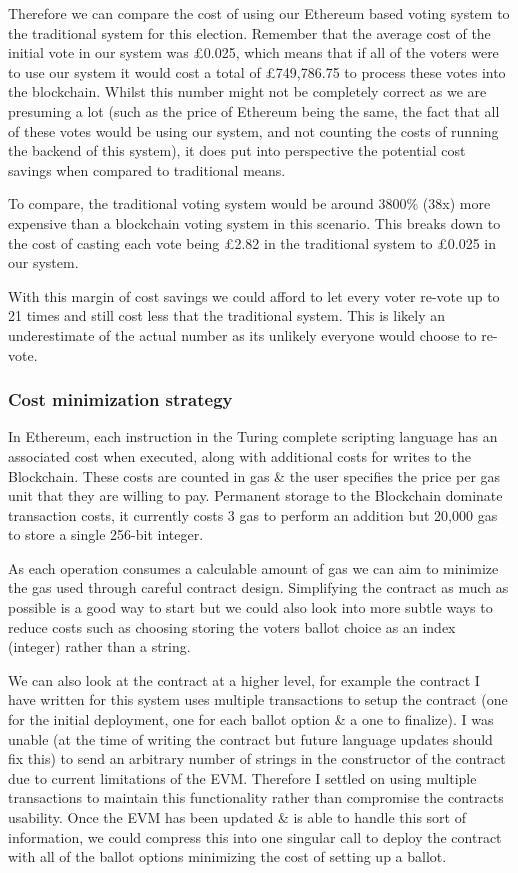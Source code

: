 \documentclass{article}
\begin{document}
	Therefore we can compare the cost of using our Ethereum based voting system to the traditional system for this election. Remember that the average cost of the initial vote in our system was \pounds0.025, which means that if all of the voters were to use our system it would cost a total of \pounds749,786.75 to process these votes into the blockchain. Whilst this number might not be completely correct as we are presuming a lot (such as the price of Ethereum being the same, the fact that all of these votes would be using our system, and not counting the costs of running the backend of this system), it does put into perspective the potential cost savings when compared to traditional means.
	
	To compare, the traditional voting system would be around 3800\% (38x) more expensive than a blockchain voting system in this scenario. This breaks down to the cost of casting each vote being \pounds2.82 in the traditional system to \pounds0.025 in our system.
	
	With this margin of cost savings we could afford to let every voter re-vote up to 21 times and still cost less that the traditional system. This is likely an underestimate of the actual number as its unlikely everyone would choose to re-vote.
	
	\cleardoublepage
	\subsubsection{Cost minimization strategy}
	In Ethereum, each instruction in the Turing complete scripting language has an associated cost when executed, along with additional costs for writes to the Blockchain. These costs are counted in gas \& the user specifies the price per gas unit that they are willing to pay. Permanent storage to the Blockchain dominate transaction costs, it currently costs 3 gas to perform an addition but 20,000 gas to store a single 256-bit integer.
	
	As each operation consumes a calculable amount of gas we can aim to minimize the gas used through careful contract design. Simplifying the contract as much as possible is a good way to start but we could also look into more subtle ways to reduce costs such as choosing storing the voters ballot choice as an index (integer) rather than a string.
	
	We can also look at the contract at a higher level, for example the contract I have written for this system uses multiple transactions to setup the contract (one for the initial deployment, one for each ballot option \& a one to finalize). I was unable (at the time of writing the contract but future language updates should fix this) to send an arbitrary number of strings in the constructor of the contract due to current limitations of the EVM. Therefore I settled on using multiple transactions to maintain this functionality rather than compromise the contracts usability. Once the EVM has been updated \& is able to handle this sort of information, we could compress this into one singular call to deploy the contract with all of the ballot options minimizing the cost of setting up a ballot.
	
\end{document}
